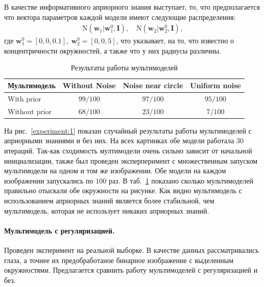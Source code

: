 \documentclass[12pt, twoside]{article}
\numberwithin{equation}{section}
\begin{document}
В качестве информативного априорного знания выступает, то, что предполагается что вектора параметров каждой модели имеют следующие распределения:
\begin{equation}
\label{eq:ce:1}
\begin{aligned}
\text{N}\left(\textbf{w}_1|\textbf{w}^{0}_{1}, \textbf{I}\right), \quad \text{N}\left(\textbf{w}_2|\textbf{w}^{0}_{2}, \textbf{I}\right),
\end{aligned}
\end{equation}
где $\textbf{w}^{0}_1 = [0, 0, 0.1],\ \textbf{w}^{0}_2 = [0, 0, 5]$, что указывает, на то, что известно о концентричности окружностей, а также что у них радиусы различны.

\begin{table}[h!t]
\begin{center}
\caption{Результаты работы мультимоделей}
\label{tb:ce:1}
\begin{tabular}{|c|c|c|c|}
\hline
	Мультимодель & Without Noise& Noise near circle& Uniform noise\\
	\hline
	\multicolumn{1}{|l|}{With prior}
	& $99/100$& $97/100$& $95/100$\\
	\hline
	\multicolumn{1}{|l|}{Without prior}
	& $68/100$& $23/100$& $7/100$\\
\hline

\end{tabular}
\end{center}
\end{table}

На рис.~\ref{experiment:1} показан случайный результаты работы мультимоделей с априорными знаниями и без них. На всех картинках обе модели работала $30$ итераций. Так-как сходимость мултимодели очень сильно зависит от начальной инициализации, также был проведен эксперперимент с множественным запуском мультимодели на одном и том же изображении. Обе модели на каждом изображении запускались по $100$ раз. В таб.~\ref{tb:ce:1} показано сколько мультимоделей правильно отыскали обе окружности на рисунке. Как видно мультимодель с использованием априорных знаний является более стабильной, чем мультимодель, которая не использует никаких априорных знаний.

\paragraph{Мультимодель с регуляризацией.}
Проведен эксперимент на реальной выборке. В качестве данных рассматривались глаза, а точнее их предобработаное бинарное изображение с выделенным окружностями. Предлагается сравнить работу мультимоделей с регуляризацией и без.
\end{document}
